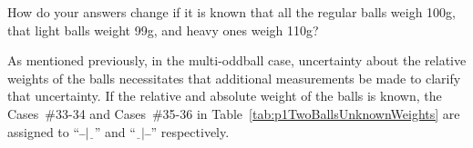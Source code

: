 \begin{subproblem}
  How do your answers change if it is known that all the regular balls weigh 100g, that light balls weight 99g, and heavy ones weigh 110g?
\end{subproblem}

  As mentioned previously, in the multi-oddball case, uncertainty about the relative weights of the balls necessitates that additional measurements be made to clarify that uncertainty.  If the relative and absolute weight of the balls is known, the Cases~\#33-34 and Cases~\#35-36 in Table~\ref{tab:p1TwoBallsUnknownWeights} are assigned to ``${\bar{~}\bar{~}|\underline{~~}}$'' and ``${\underline{~~}|\bar{~}\bar{~}}$'' respectively.